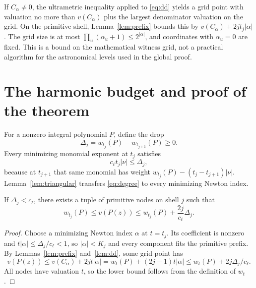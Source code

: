 \documentclass[11pt]{article}
\begin{document}
If $C_\alpha\ne0$, the ultrametric inequality applied to \eqref{eq:dd} yields a grid point with valuation no more than $v(C_\alpha)$ plus the largest denominator valuation on the grid. On the primitive shell, Lemma~\ref{lem:prefix} bounds this by $v(C_\alpha)+2jt_j|\alpha|$. The grid size is at most $\prod_u(\alpha_u+1)\le2^{|\alpha|}$, and coordinates with $\alpha_u=0$ are fixed. This is a bound on the mathematical witness grid, not a practical algorithm for the astronomical levels used in the global proof.

\section{The harmonic budget and proof of the theorem}\label{sec:proof}
For a nonzero integral polynomial $P$, define the drop
\[
 \Delta_j=w_{t_j}(P)-w_{t_{j+1}}(P)\ge0.
\]
Every minimizing monomial exponent at $t_j$ satisfies
\begin{equation}\label{eq:degree}
 c_\ell t_j|\nu|\le\Delta_j,
\end{equation}
because at $t_{j+1}$ that same monomial has weight $w_{t_j}(P)-(t_j-t_{j+1})|\nu|$. Lemma~\ref{lem:triangular} transfers \eqref{eq:degree} to every minimizing Newton index.

\begin{lemma}\label{lem:shell}
If $\Delta_j<c_\ell$, there exists a tuple of primitive nodes on shell $j$ such that
\begin{equation}\label{eq:sample}
 w_{t_j}(P)\le v(P(z))\le w_{t_j}(P)+\frac{2j}{c_\ell}\Delta_j.
\end{equation}
\end{lemma}
\begin{proof}
Choose a minimizing Newton index $\alpha$ at $t=t_j$. Its coefficient is nonzero and $t|\alpha|\le\Delta_j/c_\ell<1$, so $|\alpha|<K_j$ and every component fits the primitive prefix. By Lemmas~\ref{lem:prefix} and~\ref{lem:dd}, some grid point has
\[
 v(P(z))\le v(C_\alpha)+2jt|\alpha|
 =w_t(P)+(2j-1)t|\alpha|\le w_t(P)+2j\Delta_j/c_\ell.
\]
All nodes have valuation $t$, so the lower bound follows from the definition of $w_t$.
\end{proof}
\end{document}
